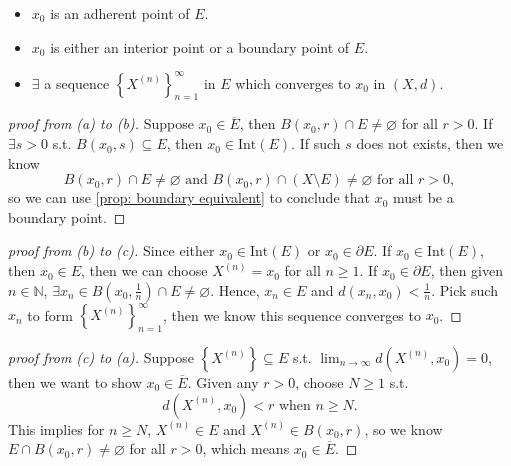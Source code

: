 \begin{proposition}[TFAE] \label{prop: adherent point TFAE}
    \vphantom{text}
    \begin{itemize}
        \item [(a)] \(x_0\) is an adherent point of \(E\). 
        \item [(b)] \(x_0\) is either an interior point or a boundary point of \(E\). 
        \item [(c)] \(\exists \) a sequence \(\left\{ X^{(n)} \right\}_{n=1}^{\infty}  \) in \(E\) which converges to \(x_0\) in \((X, d)\).        
    \end{itemize}
\end{proposition}
\begin{proof}[proof from (a) to (b)]
    Suppose \(x_0 \in \overline{E} \), then \(B(x_0, r) \cap E \neq \varnothing \) for all \(r > 0\). If \(\exists s > 0\) s.t. \(B(x_0, s) \subseteq E\), then \(x_0 \in \mathrm{Int}(E)\). If such \(s\) does not exists, then we know
    \[
        B(x_0, r) \cap E \neq \varnothing \text{ and } B(x_0, r) \cap (X \setminus E) \neq \varnothing \text{ for all } r>0,
    \]
    so we can use \autoref{prop: boundary equivalent} to conclude that \(x_0\) must be a boundary point.        
\end{proof}
\begin{proof}[proof from (b) to (c)]
    Since either \(x_0 \in \mathrm{Int}(E) \) or \(x_0 \in \partial E\). If \(x_0 \in \mathrm{Int}(E) \), then \(x_0 \in E\), then we can choose \(X^{(n)} = x_0\) for all \(n \ge 1\). If \(x_0 \in \partial E\), then given \(n \in \mathbb{N} \), \(\exists x_n \in B\left( x_0, \frac{1}{n} \right) \cap E \neq \varnothing \). Hence, \(x_n \in E\) and \(d(x_n, x_0) < \frac{1}{n}\). Pick such \(x_n\) to form \(\left\{ X^{(n)} \right\}_{n=1}^{\infty}  \), then we know this sequence converges to \(x_0\).       
\end{proof}
\begin{proof}[proof from (c) to (a)]
    Suppose \(\left\{ X^{(n)} \right\}  \subseteq E\) s.t. \(\lim_{n \to \infty} d\left( X^{(n)}, x_0 \right) = 0  \), then we want to show \(x_0 \in \overline{E} \). Given any \(r > 0\), choose \(N \ge 1\) s.t. 
    \[
        d \left( X^{(n)}, x_0 \right) < r \text{ when } n \ge N. 
    \]     
    This implies for \(n \ge N\), \(X^{(n)} \in E\) and \(X^{(n)} \in B(x_0, r)\), so we know \(E \cap B(x_0, r) \neq \varnothing \) for all \(r > 0\), which means \(x_0 \in \overline{E} \).   
\end{proof}

